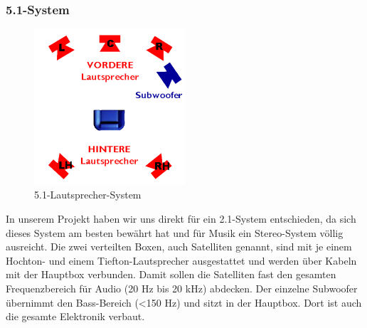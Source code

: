 \subsubsection*{5.1-System}
\begin{figure} [H]
	\centering
	\includegraphics[width=0.5\textwidth]{img/Grundlagen/Mehrweg-Lautsprechersysteme/DOLBYDigital51-cut.jpg}
	\caption{5.1-Lautsprecher-System}
	\label{fig:3.2.5}
\end{figure}





In unserem Projekt haben wir uns direkt für ein 2.1-System entschieden, da sich dieses System am besten bewährt hat und für Musik ein Stereo-System völlig ausreicht.
Die zwei verteilten Boxen, auch Satelliten genannt, sind mit je einem Hochton- und einem Tiefton-Lautsprecher ausgestattet und werden über Kabeln mit der Hauptbox verbunden.
Damit sollen die Satelliten fast den gesamten Frequenzbereich für Audio (20 Hz bis 20 kHz) abdecken.
Der einzelne Subwoofer übernimmt den Bass-Bereich (<150 Hz) und sitzt in der Hauptbox.
Dort ist auch die gesamte Elektronik verbaut.

